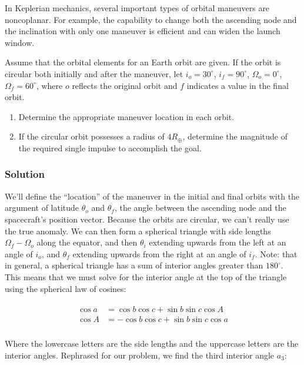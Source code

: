 \documentclass[
]{article}
\providecommand{\tightlist}{%
  \setlength{\itemsep}{0pt}\setlength{\parskip}{0pt}}
\begin{document}
In Keplerian mechanics, several important types of orbital maneuvers are
noncoplanar. For example, the capability to change both the ascending
node and the inclination with only one maneuver is efficient and can
widen the launch window.

Assume that the orbital elements for an Earth orbit are given. If the
orbit is circular both initially and after the maneuver, let
\(i_o=30^\circ\), \(i_f=90^\circ\), \(\Omega_o=0^\circ\),
\(\Omega_f=60^\circ\), where \(o\) reflects the original orbit and \(f\)
indicates a value in the final orbit.

\begin{enumerate}
\tightlist
\item
  Determine the appropriate maneuver location in each orbit.
\item
  If the circular orbit possesses a radius of \(4R_\oplus\), determine
  the magnitude of the required single impulse to accomplish the goal.
\end{enumerate}

\subsubsection{Solution}\label{solution-1}

We'll define the ``location'' of the maneuver in the initial and final
orbits with the argument of latitude \(\theta_o\) and \(\theta_f\), the
angle between the ascending node and the spacecraft's position vector.
Because the orbits are circular, we can't really use the true anomaly.
We can then form a spherical triangle with side lengths
\(\Omega_f - \Omega_o\) along the equator, and then \(\theta_i\)
extending upwards from the left at an angle of \(i_o\), and \(\theta_f\)
extending upwards from the right at an angle of \(i_f\). Note: that in
general, a spherical triangle has a sum of interior angles greater than
\(180^\circ\). This means that we must solve for the interior angle at
the top of the triangle using the spherical law of cosines:

\[\begin{aligned}
\begin{aligned}
    \cos a &= \cos b \cos c + \sin b \sin c \cos A \\
    \cos A &= - \cos b \cos c + \sin b \sin c \cos a \\
\end{aligned}
\end{aligned}\]

Where the lowercase letters are the side lengths and the uppercase
letters are the interior angles. Rephrased for our problem, we find the
third interior angle \(a_3\):
\end{document}
